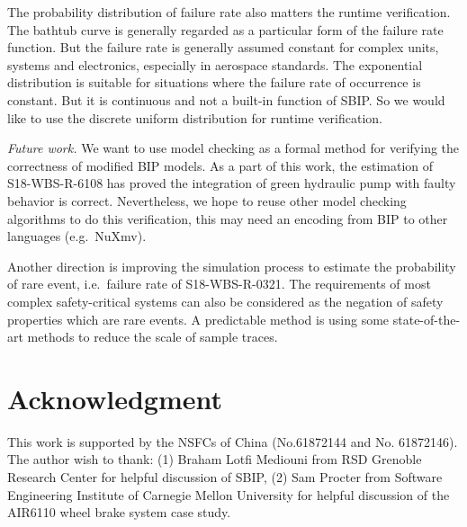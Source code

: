 \documentclass[runningheads]{llncs}
\begin{document}
The probability distribution of failure rate also matters the runtime verification. The bathtub curve is generally regarded as a particular form of the failure rate function. But the failure rate is generally assumed constant for complex units, systems and electronics, especially in aerospace standards. The exponential distribution is suitable for situations where the failure rate of occurrence is constant. But it is continuous and not a built-in function of SBIP. So we would like to use the discrete uniform distribution for runtime verification.

\emph{Future work.}  We want to use model checking as a formal method for verifying the correctness of modified BIP models. As a part of this work, the estimation of S18-WBS-R-6108 has proved the integration of green hydraulic pump with faulty behavior is correct. Nevertheless, we hope to reuse other model checking algorithms to do this verification, this may need an encoding from BIP to other languages (e.g.\ NuXmv).

Another direction is improving the simulation process to estimate the probability of rare event, i.e.\ failure rate of S18-WBS-R-0321. The requirements of most complex safety-critical systems can also be considered as the negation of safety properties which are rare events. A predictable method is using some state-of-the-art methods\cite{rarevent1}\cite{rarevent2} to reduce the scale of sample traces.

\section*{Acknowledgment}

This work is supported by the NSFCs of China (No.61872144 and No. 61872146). The author wish to thank: (1) Braham Lotfi Mediouni from RSD Grenoble Research Center for helpful discussion of SBIP, (2) Sam Procter from Software Engineering Institute of Carnegie Mellon University for helpful discussion of the AIR6110 wheel brake system case study.

%
%
%
% 
% 
%



\end{document}
